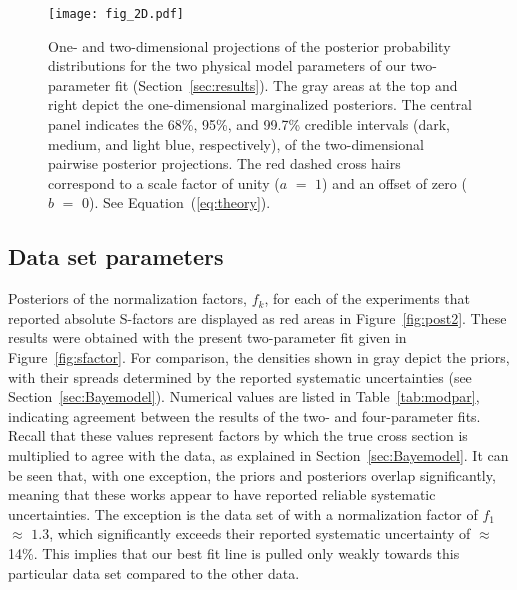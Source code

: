 \documentclass[twocolumn]{aastex63}
\begin{document}
%
\begin{figure}
\texttt{[image: fig\_2D.pdf]}
\caption{One- and two-dimensional projections of the posterior probability distributions for the two physical model parameters of our two-parameter fit (Section~\ref{sec:results}). The gray areas at the top and right depict the one-dimensional marginalized posteriors. The central panel indicates the 68\%, 95\%, and 99.7\% credible intervals (dark, medium, and light blue, respectively), of the two-dimensional pairwise posterior projections. The red dashed cross hairs correspond to a scale factor of unity ($a$ $=$ $1$) and an offset of zero ($b$ $=$ $0$). See Equation~(\ref{eq:theory}).
}
\label{fig:2D}
\end{figure}
 

\subsection{Data set parameters} 
\label{sec:datapar}
Posteriors of the normalization factors, $f_k$, for each of the experiments that reported absolute S-factors are displayed as red areas in Figure~\ref{fig:post2}. These results were obtained with the present two-parameter fit given in Figure~\ref{fig:sfactor}. For comparison, the densities shown in gray depict the priors, with their spreads determined by the reported systematic uncertainties (see Section~\ref{sec:Bayemodel}). Numerical values are listed in Table~\ref{tab:modpar}, indicating agreement between the results of the two- and four-parameter fits. Recall that these values represent factors by which the true cross section is multiplied to agree with the data, as explained in Section~\ref{sec:Bayemodel}. It can be seen that, with one exception, the priors and posteriors overlap significantly, meaning that these works appear to have reported reliable systematic uncertainties. The exception is the data set of \citet{Turkat21} with a normalization factor of $f_1$ $\approx$ $1.3$, which significantly exceeds their reported systematic uncertainty of $\approx$14\%. This implies that our best fit line is pulled only weakly towards this particular data set compared to the other data. 
\end{document}
